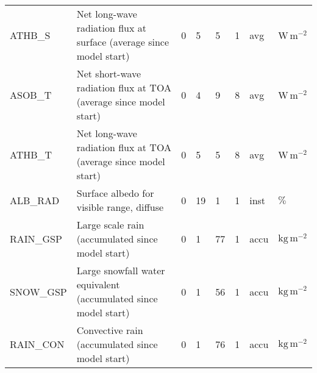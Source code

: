 \begin{longtable}{p{2.0cm}p{5.0cm}p{0.8cm}p{0.8cm}p{0.8cm}p{0.9cm}p{1cm}p{1cm}}
ATHB\_S                        &  Net long-wave radiation flux at surface (average since model start)                   &               0                                   &                     5                       &                     5                      &                 1                           &                      avg                    &        $\mathrm{W\,m^{-2}}$    \\
ASOB\_T                        &  Net short-wave radiation flux at TOA (average since model start)                      &               0                                   &                     4                       &                     9                      &                 8                           &                      avg                    &        $\mathrm{W\,m^{-2}}$    \\
ATHB\_T                        &  Net long-wave radiation flux at TOA (average since model start)                       &               0                                   &                     5                       &                     5                      &                 8                           &                      avg                    &        $\mathrm{W\,m^{-2}}$    \\ 
ALB\_RAD                       &  Surface albedo for visible range, diffuse                                             &               0                                   &                    19                       &                     1                      &                 1                           &                      inst                   &        $\mathrm{\%}$    \\
RAIN\_GSP                      &  Large scale rain (accumulated since model start)                                      &               0                                   &                     1                       &                    77                      &                 1                           &                      accu                   &        $\mathrm{kg\,m^{-2}}$    \\
SNOW\_GSP                      &  Large snowfall water equivalent (accumulated since model start)                       &               0                                   &                     1                       &                    56                      &                 1                           &                      accu                   &        $\mathrm{kg\,m^{-2}}$    \\
RAIN\_CON                      &  Convective rain (accumulated since model start)                                       &               0                                   &                     1                       &                    76                      &                 1                           &                      accu                   &        $\mathrm{kg\,m^{-2}}$    \\

\end{longtable}
